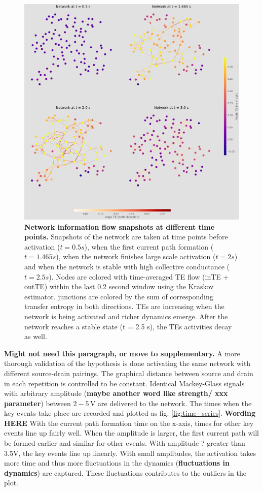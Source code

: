 \documentclass[fleqn,10pt,  reprint, amsmath,amssymb,aps, floatfix]{wlscirep}
\begin{document}
\begin{figure}[h]
	\centering
	\includegraphics[width = 0.8\paperwidth]{figure/time_network_comparison}
	\caption{\textbf{Network information flow snapshots at different time points.}
			Snapshots of the network are taken at time points before activation ($t = 0.5s$), when the first current path formation ($t=1.465s$), when the network finishes large scale activation ($t = 2s$) and when the network is stable with high collective conductance ($t = 2.5s$).
			Nodes are colored with time-averaged TE flow (inTE + outTE) within the last 0.2 second window using the Kraskov estimator. junctions are colored by the sum of corresponding transfer entropy in both directions. TEs are increasing when the network is being activated and richer dynamics emerge. After the network reaches a stable state (t = 2.5 s), the TEs activities decay as well.}
	\label{fig:network_comparison}
\end{figure}

\textbf{Might not need this paragraph, or move to supplementary.}
A more thorough validation of the hypothesis is done activating the same network with different source-drain pairings. The graphical distance between source and drain in each repetition is controlled to be constant. Identical Mackey-Glass signals with arbitrary amplitude (\textbf{maybe another word like strength/ xxx parameter}) between $2-5\,$V are delivered to the network. The times when the key events take place are recorded and plotted as fig. \ref{fig:time_series}. \textbf{Wording HERE} With the current path formation time on the x-axis, times for other key events line up fairly well. When the amplitude is larger, the first current path will be formed earlier and similar for other events. With amplitude ? greater than 3.5V, the key events line up linearly. With small amplitudes, the activation takes more time and thus more fluctuations in the dynamics (\textbf{fluctuations in dynamics}) are captured. These fluctuations contributes to the outliers in the plot.
\end{document}
